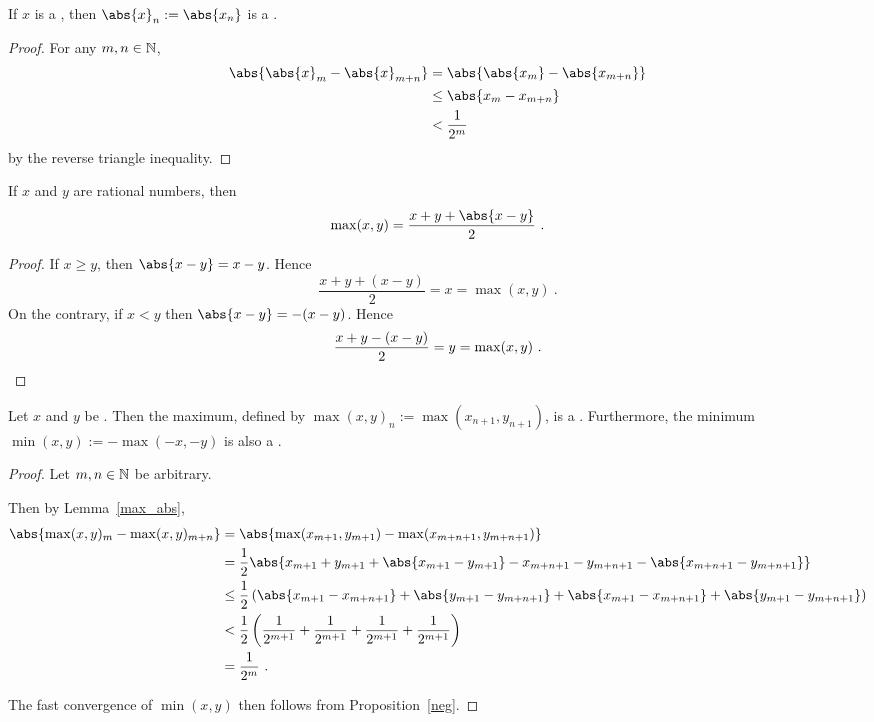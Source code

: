 \documentclass[leqno]{report}
\begin{document}
\begin{Proposition}
    If $x$ is a \FCCS, then $\abs{x}_n := \abs{x_n}$ is a \FCCS.
\end{Proposition}

\begin{proof}
    For any $m, n \in \mathbb{N}$,
    \begin{align*}
        \abs{\abs{x}_m - \abs{x}_{m+n}}
        &= \abs{\abs{x_m} - \abs{x_{m+n}}} \\
        &\leq \abs{x_m - x_{m+n}} \\
        &< \frac{1}{2^m}
    \end{align*}
    by the reverse triangle inequality.
\end{proof}

\begin{Lemma} \label{max_abs}
    If $x$ and $y$ are rational numbers, then
    \[
        \max(x, y) = \frac{x + y + \abs{x - y}}{2} \ .
    \]
\end{Lemma}

\begin{proof}
    If $x \geq y$, then $\abs{x - y} = x - y$. Hence
    \[
        \frac{x + y + (x - y)}{2} = x = \max(x, y) \ .
    \]
    On the contrary, if $x < y$ then $\abs{x - y} = -(x - y)$. Hence
    \[
        \frac{x + y - (x - y)}{2} = y = \max(x, y) \ . \qedhere
    \]
\end{proof}

\begin{Proposition}
    Let $x$ and $y$ be \FCCS. Then the maximum, defined by $\max(x, y)_n := \max\left(x_{n+1}, y_{n+1}\right)$, is a \FCCS. Furthermore, the minimum $\min(x, y) := -\max(-x, -y)$ is also a \FCCS.
\end{Proposition}

\begin{proof}
    Let $m, n \in \mathbb{N}$ be arbitrary.

    Then by Lemma~\ref{max_abs},
    \begin{align*}
        \abs{\max(x, y)_m - \max(x, y)_{m+n}}
        &= \abs{\max(x_{m+1}, y_{m+1}) - \max(x_{m+n+1}, y_{m+n+1})} \\
        &= \frac{1}{2} \abs{x_{m+1} + y_{m+1} + \abs{x_{m+1} - y_{m+1}} - x_{m+n+1} - y_{m+n+1} - \abs{x_{m+n+1} - y_{m+n+1}}} \\
        &\leq \frac{1}{2} \left( \abs{x_{m+1} - x_{m+n+1}} + \abs{y_{m+1} - y_{m+n+1}} + \abs{x_{m+1} - x_{m+n+1}} + \abs{y_{m+1} - y_{m+n+1}} \right) \\
        &< \frac{1}{2} \left( \frac{1}{2^{m+1}} + \frac{1}{2^{m+1}} + \frac{1}{2^{m+1}} + \frac{1}{2^{m+1}} \right) \\
        &= \frac{1}{2^m} \ .
    \end{align*}

    The fast convergence of $\min(x, y)$ then follows from Proposition~\ref{neg}.
\end{proof}
\end{document}
